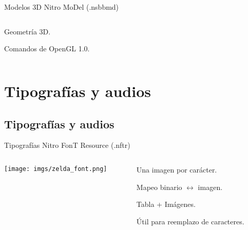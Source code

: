 \begin{frame}{Modelos 3D}
    \centering{}Nitro MoDel (.nsbbmd) \\ \vspace{5pt}
    \begin{columns}
    \begin{column}{0.5\textwidth}
        \begin{wideitemize}
            \item<1-> Geometría 3D.
            \item<2-> Comandos de OpenGL 1.0.
        \end{wideitemize}
    \end{column}
    \begin{column}{0.6\textwidth}
    \end{column}
    \end{columns}
\end{frame}

\section{Tipografías y audios}
\subsection{Tipografías y audios}
\begin{frame}{Tipografías}
    \centering{}Nitro FonT Resource (.nftr) \\ \vspace{5pt}
    \begin{columns}
    \begin{column}{0.5\textwidth}
        \texttt{[image: imgs/zelda\_font.png]}
    \end{column}
    \begin{column}{0.6\textwidth}
        \begin{wideitemize}
            \item<+-> Una imagen por carácter.
            \item<+-> Mapeo binario $\leftrightarrow$ imagen.
            \item<+-> Tabla + Imágenes.
            \item<+-> Útil para reemplazo de caracteres.
        \end{wideitemize}
    \end{column}
    \end{columns}
\end{frame}

